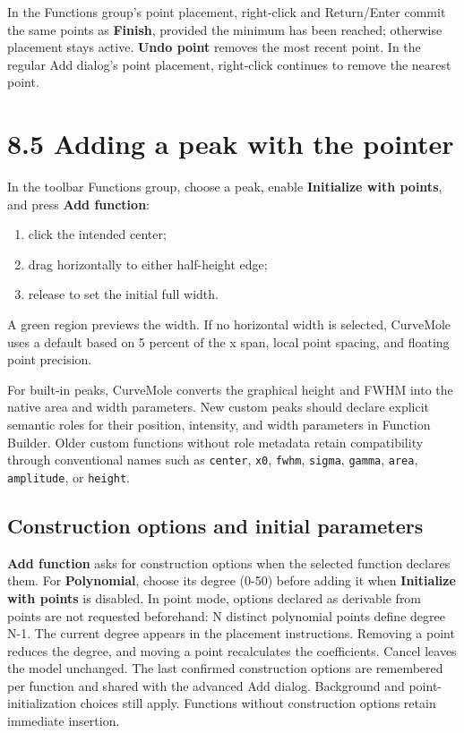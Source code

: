 \documentclass[
  10pt,
  a4paper,
  oneside]{scrreprt}
\providecommand{\tightlist}{%
  \setlength{\itemsep}{0pt}\setlength{\parskip}{0pt}}
\begin{document}
In the Functions group's point placement, right-click and Return/Enter
commit the same points as \textbf{Finish}, provided the minimum has been
reached; otherwise placement stays active. \textbf{Undo point} removes
the most recent point. In the regular Add dialog's point placement,
right-click continues to remove the nearest point.

\hypertarget{adding-a-peak-with-the-pointer}{%
\section{8.5 Adding a peak with the
pointer}\label{adding-a-peak-with-the-pointer}}

In the toolbar Functions group, choose a peak, enable \textbf{Initialize
with points}, and press \textbf{Add function}:

\begin{enumerate}
\def\labelenumi{\arabic{enumi}.}
\tightlist
\item
  click the intended center;
\item
  drag horizontally to either half-height edge;
\item
  release to set the initial full width.
\end{enumerate}

A green region previews the width. If no horizontal width is selected,
CurveMole uses a default based on 5 percent of the x span, local point
spacing, and floating point precision.

For built-in peaks, CurveMole converts the graphical height and FWHM
into the native area and width parameters. New custom peaks should
declare explicit semantic roles for their position, intensity, and width
parameters in Function Builder. Older custom functions without role
metadata retain compatibility through conventional names such as
\texttt{center}, \texttt{x0}, \texttt{fwhm}, \texttt{sigma},
\texttt{gamma}, \texttt{area}, \texttt{amplitude}, or \texttt{height}.

\hypertarget{construction-options-and-initial-parameters}{%
\subsection{Construction options and initial
parameters}\label{construction-options-and-initial-parameters}}

\textbf{Add function} asks for construction options when the selected
function declares them. For \textbf{Polynomial}, choose its degree
(0-50) before adding it when \textbf{Initialize with points} is
disabled. In point mode, options declared as derivable from points are
not requested beforehand: N distinct polynomial points define degree
N-1. The current degree appears in the placement instructions. Removing
a point reduces the degree, and moving a point recalculates the
coefficients. Cancel leaves the model unchanged. The last confirmed
construction options are remembered per function and shared with the
advanced Add dialog. Background and point-initialization choices still
apply. Functions without construction options retain immediate
insertion.
\end{document}
